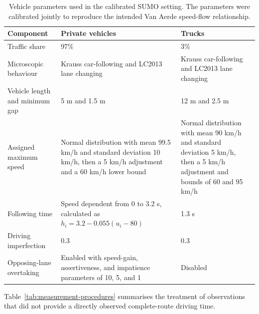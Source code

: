 \documentclass{article}
\begin{document}
\begin{table}[htbp]
\centering
\footnotesize
\setlength{\tabcolsep}{4pt}
\begin{tabular}{@{}p{}p{}p{}@{}}
\toprule
\textbf{Component} & \textbf{Private vehicles} & \textbf{Trucks} \\
\midrule
Traffic share & 97\% & 3\% \\
Microscopic behaviour & Krauss car-following and LC2013 lane changing & Krauss car-following and LC2013 lane changing \\
Vehicle length and minimum gap & 5 m and 1.5 m & 12 m and 2.5 m \\
Assigned maximum speed & Normal distribution with mean 99.5 km/h and standard deviation 10 km/h, then a 5 km/h adjustment and a 60 km/h lower bound & Normal distribution with mean 90 km/h and standard deviation 5 km/h, then a 5 km/h adjustment and bounds of 60 and 95 km/h \\
Following time & Speed dependent from 0 to 3.2 s, calculated as $h_i=3.2-0.055(u_i-80)$ & 1.3 s \\
Driving imperfection & 0.3 & 0.3 \\
Opposing-lane overtaking & Enabled with speed-gain, assertiveness, and impatience parameters of 10, 5, and 1 & Disabled \\
\bottomrule
\end{tabular}
\caption{Vehicle parameters used in the calibrated SUMO setting. The parameters were calibrated jointly to reproduce the intended Van Aerde speed-flow relationship.}
\label{tab:vehicle-parameters}
\end{table}

Table~\ref{tab:measurement-procedures} summarises the treatment of observations that did not provide a directly observed complete-route driving time.
\end{document}
